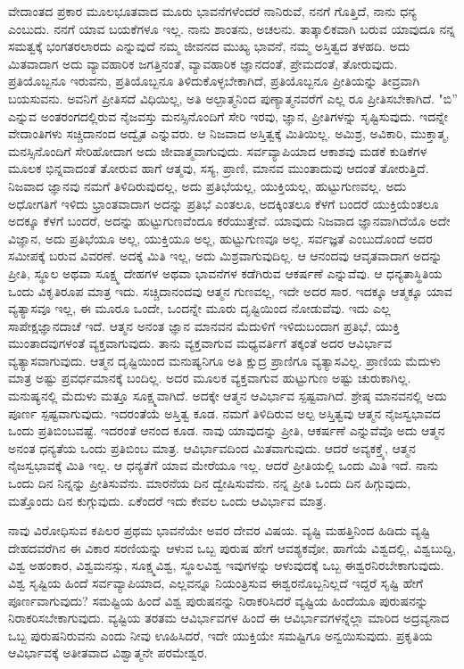 ವೇದಾಂತದ ಪ್ರಕಾರ ಮೂಲಭೂತವಾದ ಮೂರು ಭಾವನೆಗಳೆಂದರೆ ನಾನಿರುವೆ, ನನಗೆ ಗೊತ್ತಿದೆ, ನಾನು ಧನ್ಯ ಎಂಬುದು. ನನಗೆ ಯಾವ ಬಯಕೆಗಳೂ ಇಲ್ಲ. ನಾನು ಶಾಂತನು, ಅಚಲನು. ತಾತ್ಕಾಲಿಕವಾಗಿ ಬರುವ ಯಾವುದೂ ನನ್ನ ಸಮತ್ವಕ್ಕೆ ಭಂಗತರಲಾರದು ಎನ್ನುವುದೆ ನಮ್ಮ ಜೀವನದ ಮುಖ್ಯ ಭಾವನೆ, ನಮ್ಮ ಅಸ್ತಿತ್ವದ ತಳಹದಿ. ಅದು ಮಿತವಾದಾಗ ಅದು ವ್ಯಾವಹಾರಿಕ ಜಗತ್ತಿನಂತೆ, ವ್ಯಾವಹಾರಿಕ ಜ್ಞಾನದಂತೆ, ಪ್ರೇಮದಂತೆ, ತೋರುವುದು. ಪ್ರತಿಯೊಬ್ಬನೂ ಇರುವನು, ಪ್ರತಿಯೊಬ್ಬನೂ ತಿಳಿದುಕೊಳ್ಳಬೇಕಾಗಿದೆ, ಪ್ರತಿಯೊಬ್ಬನೂ ಪ್ರೀತಿಯನ್ನು ತೀವ್ರವಾಗಿ ಬಯಸುವನು. ಅವನಿಗೆ ಪ್ರೀತಿಸದೆ ವಿಧಿಯಿಲ್ಲ, ಅತಿ ಅಲ್ಪಾತ್ಮನಿಂದ ಪುಣ್ಯಾತ್ಮನವರೆಗೆ ಎಲ್ಲ ರೂ ಪ್ರೀತಿಸಬೇಕಾಗಿದೆ. "ಬಿ'' ಎನ್ನುವ ಅಂತರಂಗದಲ್ಲಿರುವ ನೈಜವಸ್ತು ಮನಸ್ಸಿನೊಂದಿಗೆ ಸೇರಿ ಇರವು, ಜ್ಞಾನ, ಪ್ರೀತಿಗಳನ್ನು ಸೃಷ್ಟಿಸುವುದು. ಇದನ್ನೇ ವೇದಾಂತಿಗಳು ಸಚ್ಚಿದಾನಂದ ಅದ್ವೈತ ಎನ್ನುವರು. ಆ ನಿಜವಾದ ಅಸ್ತಿತ್ವಕ್ಕೆ ಮಿತಿಯಿಲ್ಲ. ಅಮಿಶ್ರ, ಅವಿಕಾರಿ, ಮುಕ್ತಾತ್ಮ, ಮನಸ್ಸಿನೊಂದಿಗೆ ಸೇರಿಹೋದಾಗ ಅದು ಜೀವಾತ್ಮವಾಗುವುದು. ಸರ್ವವ್ಯಾಪಿಯಾದ ಆಕಾಶವು ಮಡಕೆ ಕುಡಿಕೆಗಳ ಮೂಲಕ ಭಿನ್ನವಾದಂತೆ ತೋರುವ ಹಾಗೆ ಆತ್ಮವು, ಸಸ್ಯ, ಪ್ರಾಣಿ, ಮಾನವ ಮುಂತಾದುವು ಆದಂತೆ ತೋರುತ್ತಿದೆ. ನಿಜವಾದ ಜ್ಞಾನವು ನಮಗೆ ತಿಳಿದಿರುವುದಲ್ಲ, ಅದು ಪ್ರತಿಭೆಯಲ್ಲ, ಯುಕ್ತಿಯಲ್ಲ, ಹುಟ್ಟುಗುಣವಲ್ಲ. ಅದು ಅಧೋಗತಿಗೆ ಇಳಿದು ಭ್ರಾಂತವಾದಾಗ ಅದನ್ನು ಪ್ರತಿಭೆ ಎಂತಲೂ, ಅದಕ್ಕಿಂತಲೂ ಕೆಳಗೆ ಬಂದರೆ ಯುಕ್ತಿಯೆಂತಲೂ ಅದಕ್ಕೂ ಕೆಳಗೆ ಬಂದರೆ, ಅದನ್ನು ಹುಟ್ಟುಗುಣವೆಂದೂ ಕರೆಯುತ್ತೇವೆ. ಯಾವುದು ನಿಜವಾದ ಜ್ಞಾನವಾಗಿದೆಯೊ ಅದೇ ವಿಜ್ಞಾನ, ಅದು ಪ್ರತಿಭೆಯೂ ಅಲ್ಲ, ಯುಕ್ತಿಯೂ ಅಲ್ಲ, ಹುಟ್ಟುಗುಣವೂ ಅಲ್ಲ. ಸರ್ವಜ್ಞತೆ ಎಂಬುದೊಂದೆ ಅದರ ಸಮೀಪಕ್ಕೆ ಬರುವ ವಿವರಣೆ. ಅದಕ್ಕೆ ಮಿತಿ ಇಲ್ಲ, ಅದು ಮಿಶ್ರವಾಗುವುದಿಲ್ಲ. ಆ ಆನಂದವು ಆವೃತವಾದಾಗ ಅದನ್ನು ಪ್ರೀತಿ, ಸ್ಥೂಲ ಅಥವಾ ಸೂಕ್ಷ್ಮ ದೇಹಗಳ ಅಥವಾ ಭಾವನೆಗಳ ಕಡೆಗಿರುವ ಆಕರ್ಷಣೆ ಎನ್ನುವೆವು. ಆ ಧನ್ಯತಾಸ್ಥಿತಿಯ ಒಂದು ವಿಕೃತಿರೂಪ ಮಾತ್ರ ಇದು. ಸಚ್ಚಿದಾನಂದವು ಆತ್ಮನ ಗುಣವಲ್ಲ, ಇದೇ ಅದರ ಸಾರ. ಇದಕ್ಕೂ ಆತ್ಮಕ್ಕೂ ಯಾವ ವ್ಯತ್ಯಾಸವೂ ಇಲ್ಲ, ಈ ಮೂರೂ ಒಂದೇ, ಒಂದನ್ನೇ ಮೂರು ದೃಷ್ಟಿಯಿಂದ ನೋಡುವೆವು. ಇದು ಎಲ್ಲ ಸಾಪೇಕ್ಷಜ್ಞಾನದಾಚೆ ಇದೆ. ಆತ್ಮನ ಅನಂತ ಜ್ಞಾನ ಮಾನವನ ಮೆದುಳಿಗೆ ಇಳಿದುಬಂದಾಗ ಪ್ರತಿಭೆ, ಯುಕ್ತಿ ಮುಂತಾದವುಗಳಂತೆ ವ್ಯಕ್ತವಾಗುವುದು. ತಾನು ವ್ಯಕ್ತವಾಗುವ ಮಧ್ಯವರ್ತಿಗೆ ತಕ್ಕಂತೆ ಅದರ ಆವಿರ್ಭಾವ ವ್ಯತ್ಯಾಸವಾಗುವುದು. ಆತ್ಮನ ದೃಷ್ಟಿಯಿಂದ ಮನುಷ್ಯನಿಗೂ ಅತಿ ಕ್ಷುದ್ರ ಪ್ರಾಣಿಗೂ ವ್ಯತ್ಯಾಸವಿಲ್ಲ. ಪ್ರಾಣಿಯ ಮೆದುಳು ಮಾತ್ರ ಅಷ್ಟು ಪ್ರವರ್ಧಮಾನಕ್ಕೆ ಬಂದಿಲ್ಲ. ಅದರ ಮೂಲಕ ವ್ಯಕ್ತವಾಗುವ ಹುಟ್ಟುಗುಣ ಅಷ್ಟು ಚುರುಕಾಗಿಲ್ಲ. ಮನುಷ್ಯನಲ್ಲಿ ಮೆದುಳು ಮತ್ತೂ ಸೂಕ್ಷ್ಮವಾಗಿದೆ. ಅದಕ್ಕೇ ಆತ್ಮನ ಆವಿರ್ಭಾವ ಸ್ಪಷ್ಟವಾಗಿದೆ. ಶ್ರೇಷ್ಠ ಮಾನವನಲ್ಲಿ ಅದು ಪೂರ್ಣ ಸ್ಪಷ್ಟವಾಗುವುದು. ಇದರಂತೆಯೆ ಅಸ್ತಿತ್ವ ಕೂಡ. ನಮಗೆ ತಿಳಿದಿರುವ ಅಲ್ಪ ಅಸ್ತಿತ್ವವು ಆತ್ಮನ ನೈಜಸ್ವಭಾವದ ಒಂದು ಪ್ರತಿಬಿಂಬವಷ್ಟೆ. ಇದರಂತೆ ಆನಂದ ಕೂಡ. ನಾವು ಯಾವುದನ್ನು ಪ್ರೀತಿ, ಆಕರ್ಷಣೆ ಎನ್ನುವೆವೊ ಅದು ಆತ್ಮನ ಅನಂತ ಧನ್ಯತೆಯ ಒಂದು ಪ್ರತಿಬಿಂಬ ಮಾತ್ರ. ಆವಿರ್ಭಾವದಿಂದ ಮಿತವಾಗುವುದು. ಆದರೆ ಅವ್ಯಕಕ್ತ್ಕೆ, ಆತ್ಮನ ನೈಜಸ್ವಭಾವಕ್ಕೆ ಮಿತಿ ಇಲ್ಲ. ಆ ಧನ್ಯತೆಗೆ ಯಾವ ಮೇರೆಯೂ ಇಲ್ಲ. ಆದರೆ ಪ್ರೀತಿಯಲ್ಲಿ ಒಂದು ಮಿತಿ ಇದೆ. ನಾನು ಒಂದು ದಿನ ನಿನ್ನನ್ನು ಪ್ರೀತಿಸುವೆನು. ಮಾರನೆಯ ದಿನ ದ್ವೇಷಿಸುವೆನು. ನನ್ನ ಪ್ರೀತಿ ಒಂದು ದಿನ ಹಿಗ್ಗುವುದು, ಮತ್ತೊಂದು ದಿನ ಕುಗ್ಗುವುದು. ಏಕೆಂದರೆ ಇದು ಕೇವಲ ಒಂದು ಆವಿರ್ಭಾವ ಮಾತ್ರ.

ನಾವು ವಿರೋಧಿಸುವ ಕಪಿಲರ ಪ್ರಥಮ ಭಾವನೆಯೇ ಅವರ ದೇವರ ವಿಷಯ. ವ್ಯಷ್ಟಿ ಮಹತ್ತಿನಿಂದ ಹಿಡಿದು ವ್ಯಷ್ಟಿ ದೇಹದವರೆಗಿನ ಈ ವಿಕಾರ ಸರಣಿಯನ್ನು ಆಳುವ ಒಬ್ಬ ಪುರುಷ ಹೇಗೆ ಆವಶ್ಯಕವೋ, ಹಾಗೆಯೆ ವಿಶ್ವದಲ್ಲಿ, ವಿಶ್ವಬುದ್ದಿ, ವಿಶ್ವ ಅಹಂಕಾರ, ವಿಶ್ವಮನಸ್ಸು, ಸೂಕ್ಷ್ಮವಿಶ್ವ, ಸ್ಥೂಲವಿಶ್ವ ಇವುಗಳನ್ನು ಆಳುವುದಕ್ಕೆ ಒಬ್ಬ ಈಶ್ವರನಿರಬೇಕಾಗುವುದು. ವಿಶ್ವ ಸೃಷ್ಟಿಯ ಹಿಂದೆ ಸರ್ವವ್ಯಾಪಿಯಾದ, ಎಲ್ಲವನ್ನೂ ನಿಯಂತ್ರಿಸುವ ಈಶ್ವರನೊಬ್ಬನಿಲ್ಲದೆ ಇದ್ದರೆ ಸೃಷ್ಟಿ ಹೇಗೆ ಪೂರ್ಣವಾಗುವುದು? ಸಮಷ್ಟಿಯ ಹಿಂದೆ ವಿಶ್ವ ಪುರುಷನನ್ನು ನಿರಾಕರಿಸಿದರೆ ವ್ಯಷ್ಟಿಯ ಹಿಂದೆಯೂ ಪುರುಷನನ್ನು ನಿರಾಕರಿಸಬೇಕಾಗುವುದು. ವ್ಯಷ್ಟಿಯ ತರತಮ ಆವಿರ್ಭಾವಗಳ ಹಿಂದೆ ಈ ಆವಿರ್ಭಾವಗಳನ್ನೆಲ್ಲಾ ಮಾರಿದ ಅದ್ರವ್ಯನಾದ ಒಬ್ಬ ಪುರುಷನಿರುವನು ಎಂದು ನೀವು ಊಹಿಸಿದರೆ, ಇದೇ ಯುಕ್ತಿಯೇ ಸಮಷ್ಟಿಗೂ ಅನ್ವಯಿಸುವುದು. ಪ್ರಕೃತಿಯ ಆವಿರ್ಭಾವಕ್ಕೆ ಅತೀತವಾದ ವಿಶ್ವಾತ್ಮನೇ ಪರಮೇಶ್ವರ.

